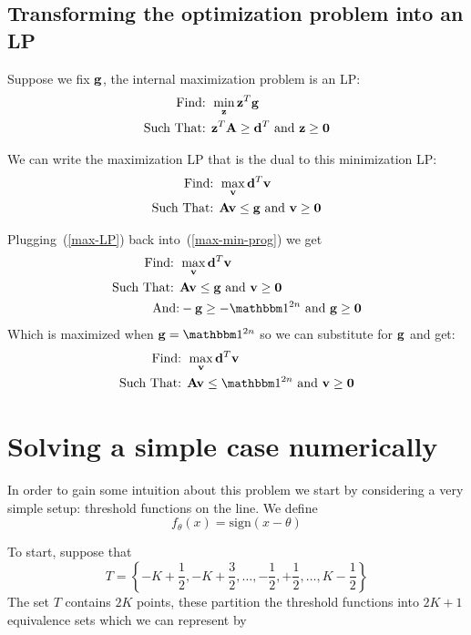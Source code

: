 \documentclass{article}[12pt]
\begin{document}
\subsection{Transforming the optimization problem into an LP}

Suppose we fix $\mathbf{g}$, the internal maximization problem is an LP:
\begin{eqnarray}
\mbox{Find: }&\min_{\mathbf{z}} \mathbf{z}^T \mathbf{g} \label{min-LP}\\
\mbox{Such That: }& \mathbf{z}^T \mathbf{A} \geq \mathbf{d}^T \mbox{ and } \mathbf{z} \geq \mathbf{0} \notag
\end{eqnarray}

We can write the maximization LP that is the dual to this minimization LP:
\begin{eqnarray}
\mbox{Find: }& \max_{\mathbf{v}} \mathbf{d}^T \mathbf{v} \label{max-LP}\\
\mbox{Such That: }& \mathbf{A} \mathbf{v} \leq \mathbf{g} \mbox{ and } \mathbf{v} \geq \mathbf{0} \notag
\end{eqnarray}

Plugging~(\ref{max-LP}) back into~(\ref{max-min-prog}) we get
\begin{eqnarray}
\mbox{Find: }& \max_\vv \vd^T \vv \label{combined1}\\
\mbox{Such That: }& \vA \vv \leq \vg \mbox{ and } \vv \geq \vzero
\notag \\
\mbox{And:}& -\vg \geq -\ones{2n} \mbox{ and } \vg \geq \vzero \notag
\end{eqnarray}
Which is maximized when $\vg = \ones{2n}$ so we can substitute for
$\mathbf{g}$ and get:
\begin{eqnarray}
\mbox{Find: }& \max_\vv \vd^T \vv \label{combined2}\\
\mbox{Such That: }& \vA \vv \leq \ones{2n} \mbox{ and } \vv \geq \vzero \notag
\end{eqnarray}

\section{Solving a simple case numerically}

In order to gain some intuition about this problem we start by
considering a very simple setup: threshold functions on the line.
We define 
\newcommand{\sign}{\mbox{sign}}
\[
f_{\theta}(x) = \sign(x-\theta)
\]

To start, suppose that 
\newcommand{\half}{\frac{1}{2}}
\[
T=\left\{-K+\half,-K+\frac{3}{2},\ldots,-\half,+\half,\ldots,K-\half \right\}
\]
The set $T$ contains $2K$ points, these partition the threshold
functions into $2K+1$ equivalence sets which we can represent by 
\end{document}
